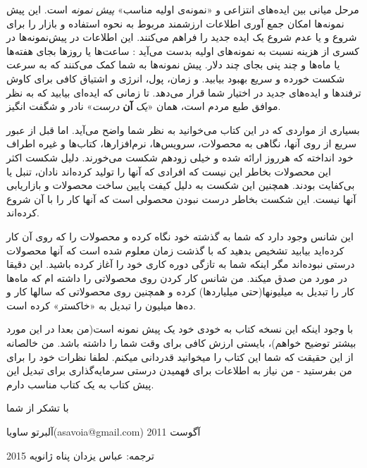 مرحل میانی بین ایده‌های انتزاعی و «نمونه‌‌ی اولیه مناسب» \emph{پیش
نمونه} است. این پیش نمونه‌ها امکان جمع آوری اطلاعات ارزشمند مربوط به
نحوه استفاده و بازار را برای شروع و یا عدم شروع یک ایده جدید را فراهم
می‌کنند. این اطلاعات در پیش‌نمونه‌ها در کسری از هزینه نسبت به نمونه‌های
اولیه بدست می‌آید : ساعت‌ها یا روزها بجای هفته‌ها یا ماه‌ها و چند پنی
بجای چند دلار. پیش نمونه‌ها به شما کمک می‌کنند که به سرعت شکست خورده و
سریع بهبود بیابید. و زمان، پول، انرژی و اشتیاق کافی برای کاوش ترفند‌ها و
ایده‌های جدید در اختیار شما قرار می‌دهد. تا زمانی که ایده‌ای بیابید که
به نظر موافق طبع مردم است، همان «\emph{یک} \textbf{آن} \emph{درست}» نادر
و شگفت انگیز.

بسیاری از مواردی که در این کتاب می‌خوانید به نظر شما واضح می‌آید. اما
قبل از عبور سریع از روی آنها، نگاهی به محصولات، سرویس‌ها، نرم‌افزارها،
کتاب‌ها و غیره اطراف خود انداخته که هرروز ارائه شده و خیلی زودهم شکست
می‌خورند. دلیل شکست اکثر این محصولات بخاطر این نیست که افرادی که آنها را
تولید کرده‌اند نادان، تنبل یا بی‌کفایت بودند. همچنین این شکست به دلیل
کیفت پایین ساخت محصولات و بازاریابی آنها نیست. این شکست بخاطر درست نبودن
محصولی است که آنها کار را با آن شروع کرده‌اند.

این شانس وجود دارد که شما به گذشته خود نگاه کرده و محصولات را که روی آن
کار کرده‌اید بیابید تشخیص بدهید که با گذشت زمان معلوم شده است که آنها
محصولات درستی نبوده‌اند مگر اینکه شما به تازگی دوره کاری خود را آغاز
کرده باشید. این دقیقا در مورد من صدق میکند. من شانس کار کردن روی
محصولاتی را داشته ام که ماه‌ها کار را تبدیل به میلیونها(حتی میلیاردها)
کرده و همچنین روی محصولاتی که سالها کار و ده‌ها میلیون را تبدیل به
«خاکستر» کرده است.

با وجود اینکه این نسخه کتاب به خودی خود یک پیش نمونه است(من بعدا در این
مورد بیشتر توضیح خواهم)، بایستی ارزش کافی برای وقت شما را داشته باشد. من
خالصانه از این حقیقت که شما این کتاب را میخوانید قدردانی میکنم. لطفا
نظرات خود را برای من بفرستید - من نیاز به اطلاعات برای فهمیدن درستی
سرمایه‌گذاری برای تبدیل این پیش کتاب به یک کتاب مناسب دارم.

با تشکر از شما

آلبرتو ساویا(asavoia@gmail.com) آگوست 2011

ترجمه: عباس یزدان پناه ژانویه 2015
